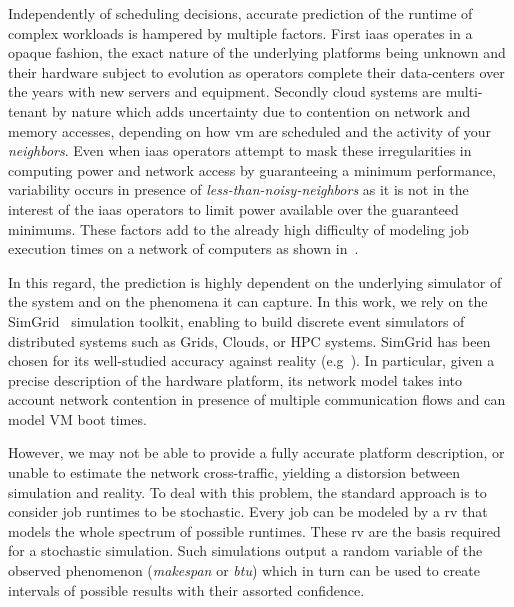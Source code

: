 \documentclass[10pt,conference,compsocconf]{IEEEtran}
\begin{document}
Independently of  scheduling decisions,  accurate prediction  of the  runtime of
complex workloads is hampered by  multiple factors.  First \ac{iaas} operates in
a opaque fashion, the exact nature of the underlying platforms being unknown and
their hardware  subject to  evolution as  operators complete  their data-centers
over  the years  with new  servers and  equipment.  Secondly  cloud systems  are
multi-tenant by nature  which adds uncertainty due to contention  on network and
memory accesses, depending on how \ac{vm} are scheduled and the activity of your
\emph{neighbors}.   Even   when  \ac{iaas}  operators  attempt   to  mask  these
irregularities in computing  power and network access by  guaranteeing a minimum
performance, variability occurs  in presence of \emph{less-than-noisy-neighbors}
as it is not in the interest of the \ac{iaas} operators to limit power available
over the guaranteed minimums.  These factors  add to the already high difficulty
of  modeling   job  execution  times  on   a  network  of  computers   as  shown
in~\cite{Lastovetsky05}.

In this regard,  the prediction is highly dependent on  the underlying simulator
of the system and on the phenomena it  can capture. In this work, we rely on the
SimGrid~\cite{simgrid}  simulation toolkit,  enabling  to  build discrete  event
simulators of distributed systems such as Grids, Clouds, or HPC systems. SimGrid
has   been    chosen   for    its   well-studied   accuracy    against   reality
(e.g~\cite{StanisicTLVM15,VelhoSCL13}).    In   particular,  given   a   precise
description  of the  hardware platform,  its  network model  takes into  account
network contention in presence of multiple  communication flows and can model VM
boot times.

However, we may not be able to provide a fully accurate platform description, or
unable  to estimate  the network  cross-traffic, yielding  a distorsion  between
simulation and reality.  To deal with this problem, the  standard approach is to
consider job runtimes to  be stochastic.  Every job can be  modeled by a \ac{rv}
that models the whole spectrum of possible runtimes. These \ac{rv} are the basis
required for a stochastic simulation.  Such simulations output a random variable
of the  observed phenomenon (\emph{makespan}  or \emph{\ac{btu}}) which  in turn
can  be  used to  create  intervals  of  possible  results with  their  assorted
confidence.
\end{document}
